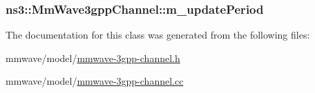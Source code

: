 \subsubsection[{\texorpdfstring{m\+\_\+update\+Period}{m_updatePeriod}}]{ ns3\+::\+Mm\+Wave3gpp\+Channel\+::m\+\_\+update\+Period\hspace{0.3cm}{\ttfamily [private]}}\hypertarget{classns3_1_1MmWave3gppChannel_a2844f8c7e7373cb777384eaf0e8a7b11}{}\label{classns3_1_1MmWave3gppChannel_a2844f8c7e7373cb777384eaf0e8a7b11}


The documentation for this class was generated from the following files\+:\begin{DoxyCompactItemize}
\item 
mmwave/model/\hyperlink{mmwave-3gpp-channel_8h}{mmwave-\/3gpp-\/channel.\+h}\item 
mmwave/model/\hyperlink{mmwave-3gpp-channel_8cc}{mmwave-\/3gpp-\/channel.\+cc}\end{DoxyCompactItemize}
